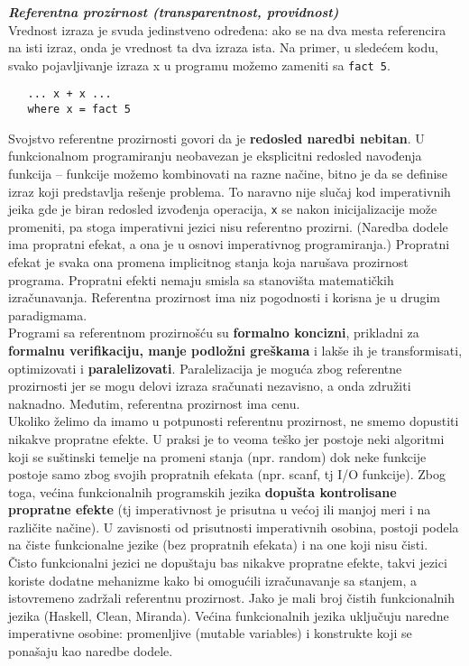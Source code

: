\documentclass[../main.tex]{subfiles}
\begin{document}
	   {\it\bf Referentna prozirnost (transparentnost, providnost)}\\
	   Vrednost izraza je svuda jedinstveno određena: ako se na dva mesta referencira na isti izraz, onda je vrednost ta dva izraza ista. Na primer, u sledećem kodu, svako pojavljivanje izraza x u programu možemo zameniti sa \texttt{fact 5}.
	   \begin{boxprimer}[width=\linewidth/2]
	   \begin{Verbatim}
   ... x + x ...
   where x = fact 5
	   \end{Verbatim}
	   \end{boxprimer}
	   Svojstvo referentne prozirnosti govori da je {\bf redosled naredbi nebitan}. U funkcionalnom programiranju neobavezan je eksplicitni redosled navođenja funkcija -- funkcije možemo kombinovati na razne načine, bitno je da se definise izraz koji predstavlja rešenje problema. To naravno nije slučaj kod imperativnih jeika gde je biran redosled izvođenja operacija, \texttt{x} se nakon inicijalizacije može promeniti, pa stoga imperativni jezici nisu referentno prozirni. (Naredba dodele ima propratni efekat, a ona je u osnovi imperativnog programiranja.) Propratni efekat je svaka ona promena implicitnog stanja koja narušava prozirnost programa. Propratni efekti nemaju smisla sa stanovišta matematičkih izračunavanja. Referentna prozirnost ima niz pogodnosti i korisna je u drugim paradigmama. 
	   \\
	   Programi sa referentnom prozirnošću su {\bf formalno koncizni}, prikladni za {\bf formalnu verifikaciju, manje podložni greškama} i lakše ih je transformisati, optimizovati i {\bf paralelizovati}. Paralelizacija je moguća zbog referentne prozirnosti jer se mogu delovi izraza sračunati nezavisno, a onda združiti naknadno. Međutim, referentna prozirnost ima cenu.
	   \\
	   Ukoliko želimo da imamo u potpunosti referentnu prozirnost, ne smemo dopustiti nikakve propratne efekte. U praksi je to veoma teško jer postoje neki algoritmi koji se suštinski temelje na promeni stanja (npr. random) dok neke funkcije postoje samo zbog svojih propratnih efekata (npr. scanf, tj I/O funkcije). Zbog toga, većina funkcionalnih programskih jezika {\bf dopušta kontrolisane propratne efekte} (tj imperativnost je prisutna u većoj ili manjoj meri i na različite načine). U zavisnosti od prisutnosti imperativnih osobina, postoji podela na čiste funkcionalne jezike (bez propratnih efekata) i na one koji nisu čisti.
	   \\
	   Čisto funkcionalni jezici ne dopuštaju bas nikakve propratne efekte, takvi jezici koriste dodatne mehanizme kako bi omogućili izračunavanje sa stanjem, a istovremeno zadržali referentnu prozirnost. Jako je mali broj čistih funkcionalnih jezika (Haskell, Clean, Miranda). Većina funkcionalnih jezika uključuju naredne imperativne osobine: promenljive (mutable variables) i konstrukte koji se ponašaju kao naredbe dodele.
\end{document}
